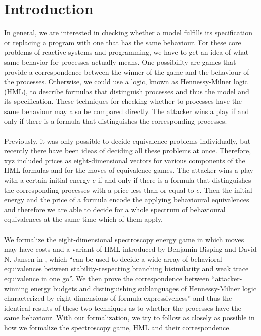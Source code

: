 \newpage
\section{Introduction} %
In general, we are interested in checking whether a model fulfills its specification or replacing a program with one that has the same behaviour.
For these core problems of reactive systems and programming, we have to get an idea of what same behavior for processes actually means.
One possibility are games that provide a correspondence between the winner of the game and the behaviour of the processes.
Otherwise, we could use a logic, known as Hennessy-Milner logic (HML), to describe formulas that distinguish processes and thus the model and its specification.
These techniques for checking whether to processes have the same behaviour may also be compared directly.
The attacker wins a play if and only if there is a formula that distinguishes the corresponding processes.
\\\\
Previously, it was only possible to decide equivalence problems individually, but recently there have been ideas of deciding all these problems at once.
Therefore, xyz included prices as eight-dimensional vectors for various components of the HML formulas and for the moves of equivalence games.
The attacker wins a play with a certain initial energy $e$ if and only if there is a formula that distinguishes the corresponding processes with a price less than or equal to $e$.
Then the initial energy and the price of a formula encode the applying behavioural equivalences and therefore we are able to decide for a whole spectrum of behavioural equivalences at the same time which of them apply.
\\\\
We formalize the eight-dimensional spectroscopy energy game in which moves may have costs and a variant of HML introduced by Benjamin Bisping and David N. Jansen in \cite{bisping2023lineartimebranchingtime}, 
which ``can be used to decide a wide array of behavioral equivalences between stability-respecting branching bisimilarity and weak trace equivalence in one go''\cite{bisping2023lineartimebranchingtime}.
We then prove the correspondence between ``attacker-winning energy budgets and distinguishing sublanguages of Hennessy-Milner logic characterized by eight dimensions of formula expressiveness'' 
and thus the identical results of these two techniques as to whether the processes have the same behaviour.
With our formalization, we try to follow \cite{bisping2023lineartimebranchingtime} as closely as possible in how we formalize the spectroscopy game, HML and their correspondence.
